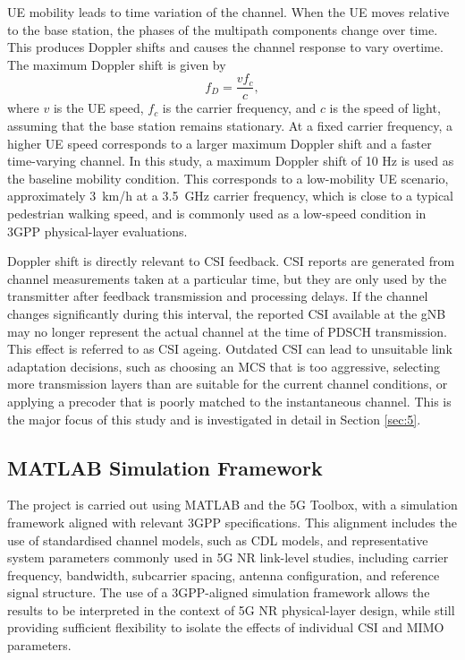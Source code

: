 \documentclass[a4paper,12pt,onecolumn]{article}
\begin{document}
		UE mobility leads to time variation of the channel. When the UE moves relative to the base station, the phases of the multipath components change over time. This produces Doppler shifts and causes the channel response to vary overtime. The maximum Doppler shift is given by
		\begin{equation}
			f_D = \frac{v f_c}{c},
		\end{equation}
		where \(v\) is the UE speed, \(f_c\) is the carrier frequency, and \(c\) is the speed of light, assuming that the base station remains stationary. At a fixed carrier frequency, a higher UE speed corresponds to a larger maximum Doppler shift and a faster time-varying channel. In this study, a maximum Doppler shift of 10 Hz is used as the baseline mobility condition. This corresponds to a low-mobility UE scenario, approximately 3~km/h at a 3.5~GHz carrier frequency, which is close to a typical pedestrian walking
		speed, and is commonly used as a low-speed condition in 3GPP physical-layer evaluations.
	
		Doppler shift is directly relevant to CSI feedback. CSI reports are generated from channel measurements taken at a particular time, but they are only used by the transmitter after feedback transmission and processing delays. If the channel changes significantly during this interval, the reported CSI available at the gNB may no longer represent the actual channel at the time of PDSCH transmission. This effect is referred to as CSI ageing. Outdated CSI can lead to unsuitable link adaptation decisions, such as choosing an MCS that is too aggressive, selecting more transmission layers than are suitable for the current channel conditions, or applying a precoder that is poorly matched to the instantaneous channel. This is the major focus of this study and is investigated in detail in Section \ref{sec:5}. 
		
\subsection{MATLAB Simulation Framework}
	
	The project is carried out using MATLAB and the 5G Toolbox, with a simulation framework aligned with relevant 3GPP specifications. This alignment includes the use of standardised channel models, such as CDL models, and representative system parameters commonly used in 5G NR link-level studies, including carrier frequency, bandwidth, subcarrier spacing, antenna configuration, and reference signal structure. The use of a 3GPP-aligned simulation framework allows the results to be interpreted in the context of 5G NR physical-layer design, while still providing sufficient flexibility to isolate the effects of individual CSI and MIMO parameters.
	
\end{document}
